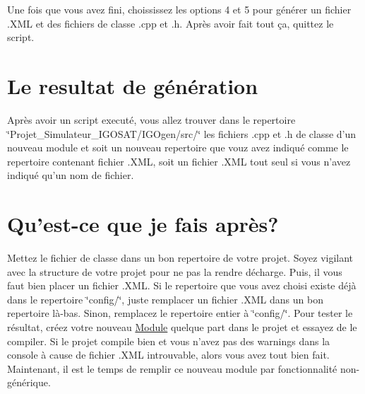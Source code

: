 Une fois que vous avez fini, choississez les options 4 et 5 pour générer un fichier .X\-M\-L et des fichiers de classe .cpp et .h. Après avoir fait tout ça, quittez le script.\hypertarget{docGenereateur_resultat}{}\section{Le resultat de génération}\label{docGenereateur_resultat}
Après avoir un script executé, vous allez trouver dans le repertoire \char`\"{}\-Projet\-\_\-\-Simulateur\-\_\-\-I\-G\-O\-S\-A\-T/\-I\-G\-Ogen/src/\char`\"{} les fichiers .cpp et .h de classe d'un nouveau module et soit un nouveau repertoire que vouz avez indiqué comme le repertoire contenant fichier .X\-M\-L, soit un fichier .X\-M\-L tout seul si vous n'avez indiqué qu'un nom de fichier.\hypertarget{docGenereateur_apres}{}\section{Qu'est-\/ce que je fais après?}\label{docGenereateur_apres}
Mettez le fichier de classe dans un bon repertoire de votre projet. Soyez vigilant avec la structure de votre projet pour ne pas la rendre décharge. Puis, il vous faut bien placer un fichier .X\-M\-L. Si le repertoire que vous avez choisi existe déjà dans le repertoire \char`\"{}config/\char`\"{}, juste remplacer un fichier .X\-M\-L dans un bon repertoire là-\/bas. Sinon, remplacez le repertoire entier à \char`\"{}config/\char`\"{}. Pour tester le résultat, créez votre nouveau \hyperlink{classModule}{Module} quelque part dans le projet et essayez de le compiler. Si le projet compile bien et vous n'avez pas des warnings dans la console à cause de fichier .X\-M\-L introuvable, alors vous avez tout bien fait. Maintenant, il est le temps de remplir ce nouveau module par fonctionnalité non-\/générique. 